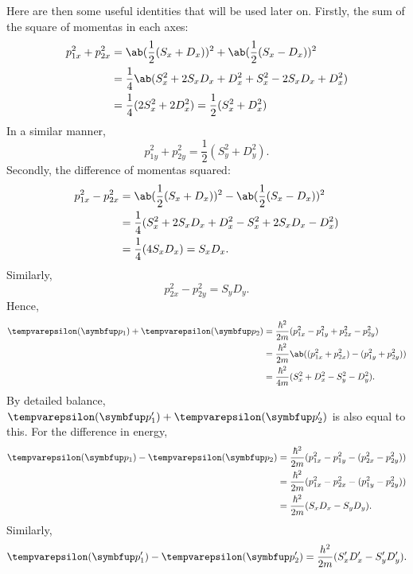 Here are then some useful identities that will be used later on. Firstly, the sum of the square of momentas in each axes:
\begin{align}
  p_{1x}^2 + p_{2x}^2
   & = \ab(\frac{1}{2}(S_x + D_x))^2 + \ab(\frac{1}{2}(S_x - D_x))^2         \\
   & = \frac{1}{4}\ab(S_x^2 + 2 S_x D_x + D_x^2 + S_x^2 - 2 S_x D_x + D_x^2) \\
   & = \frac{1}{4}(2 S_x^2 + 2 D_x^2) = \frac{1}{2}(S_x^2 + D_x^2)
\end{align}
In a similar manner,
\begin{equation}
  p_{1y}^2 + p_{2y}^2 = \frac{1}{2}(S_y^2 + D_y^2).
\end{equation}
Secondly, the difference of momentas squared:
\begin{align}
  p_{1x}^2 - p_{2x}^2
   & = \ab(\frac{1}{2}(S_x + D_x))^2 - \ab(\frac{1}{2}(S_x - D_x))^2      \\
   & = \frac{1}{4}(S_x^2 + 2 S_x D_x + D_x^2 - S_x^2 + 2 S_x D_x - D_x^2) \\
   & = \frac{1}{4}(4 S_x D_x) = S_x D_x.
\end{align}
Similarly,
\begin{equation}
  p_{2x}^2 - p_{2y}^2 = S_y D_y.
\end{equation}
Hence,
\begin{align}
  \epsilon(\vv{p}_1) + \epsilon(\vv{p}_2)
   & = \frac{\hbar^2}{2m}(p_{1x}^2 - p_{1y}^2 + p_{2x}^2 - p_{2y}^2)        \\
   & = \frac{\hbar^2}{2m}\ab((p_{1x}^2 + p_{2x}^2) - (p_{1y}^2 + p_{2y}^2)) \\
   & = \frac{\hbar^2}{4m}(S_x^2 + D_x^2 - S_y^2 - D_y^2).
\end{align}
By detailed balance, \(\epsilon(\vv{p}_1') + \epsilon(\vv{p}_2')\) is also equal to this. For the difference in energy,
\begin{align}
  \epsilon(\vv{p_1}) - \epsilon(\vv{p}_2)
   & = \frac{\hbar^2}{2m}(p_{1x}^2 - p_{1y}^2 - (p_{2x}^2 - p_{2y}^2)) \\
   & = \frac{\hbar^2}{2m}(p_{1x}^2 - p_{2x}^2 - (p_{1y}^2 - p_{2y}^2)) \\
   & = \frac{\hbar^2}{2m}(S_x D_x - S_y D_y).
\end{align}
Similarly,
\begin{equation}
  \epsilon(\vv{p}_1') - \epsilon(\vv{p}_2') = \frac{h^2}{2m}(S_x' D_x' - S_y' D_y').
\end{equation}

